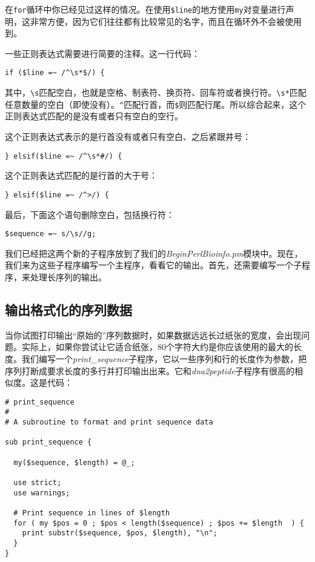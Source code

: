 在\verb|for|循环中你已经见过这样的情况。在使用\verb|$line|的地方使用\verb|my|对变量进行声明，这非常方便，因为它们往往都有比较常见的名字，而且在循环外不会被使用到。

一些正则表达式需要进行简要的注释。这一行代码：

\begin{lstlisting}
if ($line =~ /^\s*$/) {
\end{lstlisting}

其中，\verb|\s|匹配空白，也就是空格、制表符、换页符、回车符或者换行符。\verb|\s*|匹配任意数量的空白（即使没有）。\verb|^|匹配行首，而\verb|$|则匹配行尾。所以综合起来，这个正则表达式匹配的是没有或者只有空白的空行。

这个正则表达式表示的是行首没有或者只有空白、之后紧跟井号：

\begin{lstlisting}
} elsif($line =~ /^\s*#/) {
\end{lstlisting}

这个正则表达式匹配的是行首的大于号：

\begin{lstlisting}
} elsif($line =~ /^>/) {
\end{lstlisting}

最后，下面这个语句删除空白，包括换行符：

\begin{lstlisting}
$sequence =~ s/\s//g;
\end{lstlisting}

我们已经把这两个新的子程序放到了我们的\textit{BeginPerlBioinfo.pm}模块中。现在，我们来为这些子程序编写一个主程序，看看它的输出。首先，还需要编写一个子程序，来处理长序列的输出。

\subsection{输出格式化的序列数据}
当你试图打印输出“原始的”序列数据时，如果数据远远长过纸张的宽度，会出现问题。实际上，如果你尝试让它适合纸张，80个字符大约是你应该使用的最大的长度。我们编写一个\textit{print\_sequence}子程序，它以一些序列和行的长度作为参数，把序列打断成要求长度的多行并打印输出出来。它和\textit{dna2peptide}子程序有很高的相似度。这是代码：

\begin{lstlisting}
# print_sequence
#
# A subroutine to format and print sequence data 

sub print_sequence {
  
  my($sequence, $length) = @_;

  use strict;
  use warnings;

  # Print sequence in lines of $length
  for ( my $pos = 0 ; $pos < length($sequence) ; $pos += $length  ) {
    print substr($sequence, $pos, $length), "\n";
  }
}
\end{lstlisting}


